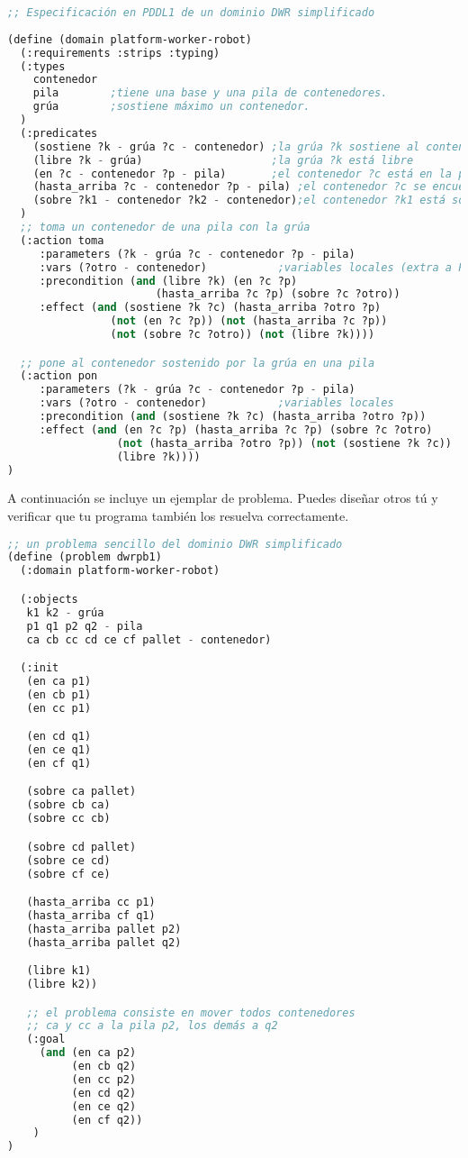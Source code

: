 \begin{lstlisting}[language=Lisp]
;; Especificación en PDDL1 de un dominio DWR simplificado
 
(define (domain platform-worker-robot)
  (:requirements :strips :typing)
  (:types
    contenedor
    pila	    ;tiene una base y una pila de contenedores.
    grúa	    ;sostiene máximo un contenedor.
  )
  (:predicates
    (sostiene ?k - grúa ?c - contenedor) ;la grúa ?k sostiene al contenedor ?c
    (libre ?k - grúa)                    ;la grúa ?k está libre
    (en ?c - contenedor ?p - pila)       ;el contenedor ?c está en la pila ?p
    (hasta_arriba ?c - contenedor ?p - pila) ;el contenedor ?c se encuentra hasta arriba de la pila ?p
    (sobre ?k1 - contenedor ?k2 - contenedor);el contenedor ?k1 está sobre el contenedor ?k2
  )
  ;; toma un contenedor de una pila con la grúa
  (:action toma
     :parameters (?k - grúa ?c - contenedor ?p - pila)
     :vars (?otro - contenedor)           ;variables locales (extra a PDDL)
     :precondition (and (libre ?k) (en ?c ?p) 
                       (hasta_arriba ?c ?p) (sobre ?c ?otro))
     :effect (and (sostiene ?k ?c) (hasta_arriba ?otro ?p)
                (not (en ?c ?p)) (not (hasta_arriba ?c ?p))
                (not (sobre ?c ?otro)) (not (libre ?k))))

  ;; pone al contenedor sostenido por la grúa en una pila
  (:action pon                                 
     :parameters (?k - grúa ?c - contenedor ?p - pila)
     :vars (?otro - contenedor)           ;variables locales
     :precondition (and (sostiene ?k ?c) (hasta_arriba ?otro ?p))
     :effect (and (en ?c ?p) (hasta_arriba ?c ?p) (sobre ?c ?otro)
                 (not (hasta_arriba ?otro ?p)) (not (sostiene ?k ?c))
                 (libre ?k))))
)
\end{lstlisting}

A continuación se incluye un ejemplar de problema.  Puedes diseñar otros tú y verificar que tu programa también los resuelva correctamente.

\begin{lstlisting}[language=Lisp]
;; un problema sencillo del dominio DWR simplificado
(define (problem dwrpb1)
  (:domain platform-worker-robot)

  (:objects
   k1 k2 - grúa
   p1 q1 p2 q2 - pila
   ca cb cc cd ce cf pallet - contenedor)

  (:init
   (en ca p1)
   (en cb p1)
   (en cc p1)

   (en cd q1)
   (en ce q1)
   (en cf q1)

   (sobre ca pallet)
   (sobre cb ca)
   (sobre cc cb)

   (sobre cd pallet)
   (sobre ce cd)
   (sobre cf ce)

   (hasta_arriba cc p1)
   (hasta_arriba cf q1)
   (hasta_arriba pallet p2)
   (hasta_arriba pallet q2)

   (libre k1)
   (libre k2))

   ;; el problema consiste en mover todos contenedores
   ;; ca y cc a la pila p2, los demás a q2
   (:goal
     (and (en ca p2)
          (en cb q2)
          (en cc p2)
          (en cd q2)
          (en ce q2)
          (en cf q2))
    )
)
\end{lstlisting}


